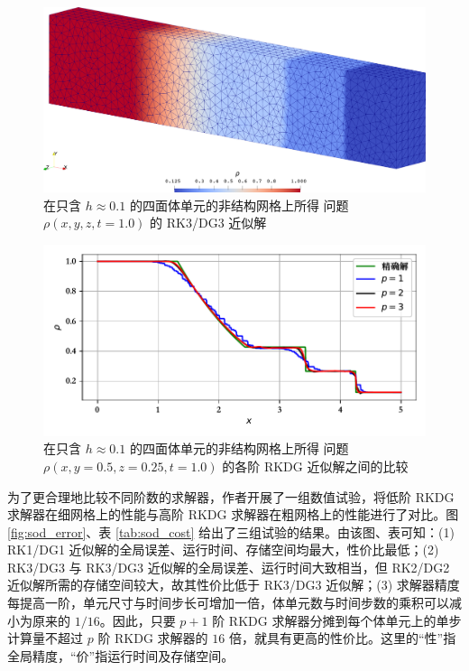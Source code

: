 \begin{figure}[h!]
\begin{centering}
\includegraphics[width=1\textwidth]{../mdpi/figures/shock_tubes/sod/contour_tetra}
\par\end{centering}
\caption{\label{fig:sod_tetra}在只含 $h\approx0.1$ 的四面体单元的非结构网格上所得 问题
$\rho(x,y,z,t=1.0)$ 的 RK3/DG3 近似解}
\end{figure}

\begin{figure}[h!]
\begin{centering}
\includegraphics[width=1\textwidth,height=0.3\textheight]{figures/shock_tubes/sod/result_tetra}
\par\end{centering}
\caption{\label{fig:sod_tetra_p_vary}在只含 $h\approx0.1$ 的四面体单元的非结构网格上所得 问题
$\rho(x,y=0.5,z=0.25,t=1.0)$ 的各阶 RKDG 近似解之间的比较}
\end{figure}

为了更合理地比较不同阶数的求解器，作者开展了一组数值试验，将低阶 RKDG 求解器在细网格上的性能与高阶 RKDG 求解器在粗网格上的性能进行了对比。图
\ref{fig:sod_error}、表 \ref{tab:sod_cost} 给出了三组试验的结果。由该图、表可知：(1)
RK1/DG1 近似解的全局误差、运行时间、存储空间均最大，性价比最低；(2) RK3/DG3 与 RK3/DG3 近似解的全局误差、运行时间大致相当，但
RK2/DG2 近似解所需的存储空间较大，故其性价比低于 RK3/DG3 近似解；(3) 求解器精度每提高一阶，单元尺寸与时间步长可增加一倍，体单元数与时间步数的乘积可以减小为原来的
$1/16$。因此，只要 $p+1$ 阶 RKDG 求解器分摊到每个体单元上的单步计算量不超过 $p$ 阶 RKDG 求解器的
$16$ 倍，就具有更高的性价比。这里的“性”指全局精度，“价”指运行时间及存储空间。


